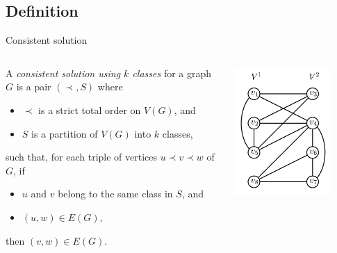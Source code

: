 \documentclass{beamer}
\begin{document}
\subsection{Definition}
\begin{frame}{Consistent solution}
    \begin{columns}
        \begin{column}{0.5\textwidth}
            \small
            A \emph{consistent solution using $k$ classes} for a graph $G$ is a pair $(\prec, S)$ where 
            \begin{itemize}
                \item $\prec$ is a strict total order on $V(G)$, and 
                \item $S$ is a partition of $V(G)$ into $k$ classes,
            \end{itemize}
            such that, for each triple of vertices $u\prec v \prec w$ of $G$, if
            \begin{itemize}
                \item $u$ and $v$ belong to the same class in $S$, and
                \item $(u,w) \in E(G)$,
            \end{itemize}
            then $(v,w) \in E(G)$.
        \end{column}
        \begin{column}{0.5\textwidth}
            \begin{center}
                \includegraphics[width=0.8\textwidth]{img/ejemplo_thinness.png}
            \end{center}
        \end{column}
    \end{columns}
\end{frame}
\end{document}
